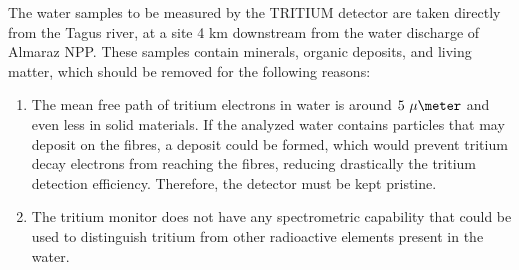 The water samples to be measured by the TRITIUM detector are taken directly from the Tagus river, at a site 4 km downstream from the water discharge of Almaraz NPP. These samples contain minerals, organic deposits, and living matter, which should be removed for the following reasons:

\begin{enumerate}

\item{} The mean free path of tritium electrons in water is around $5~\mu\meter$ and even less in solid materials. If the analyzed water contains particles that may deposit on the fibres, a deposit could be formed, which would prevent tritium decay electrons from reaching the fibres, reducing drastically the tritium detection efficiency. Therefore, the detector must be kept pristine.

\item{} The tritium monitor does not have any spectrometric capability that could be used to distinguish tritium from other radioactive elements present in the water.

\end{enumerate}




